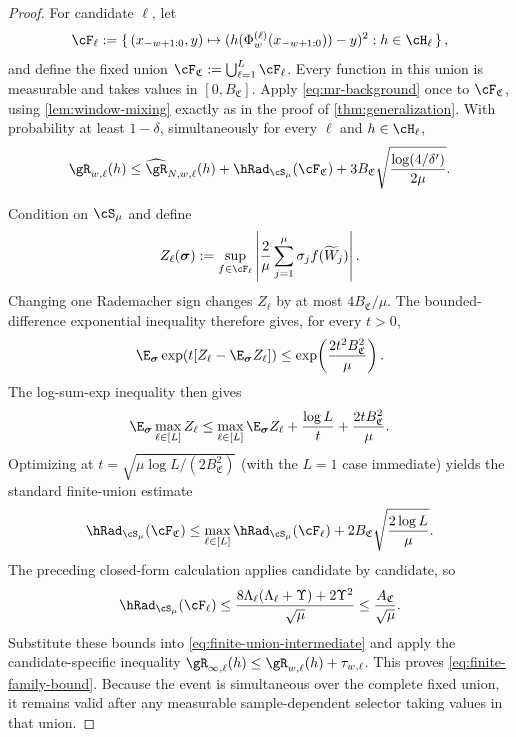 \begin{proof}
For candidate \(\ell\), let
\[
    \cF_\ell
    :=
    \set{(x_{-w+1:0},y)\mapsto
      (h(\Phi_w^{(\ell)}(x_{-w+1:0}))-y)^2:
      h\in\cH_\ell},
\]
and define the fixed union
\(\cF_{\mathfrak C}:=\bigcup_{\ell=1}^L\cF_\ell\). Every function in this
union is measurable and takes values in \([0,B_{\mathfrak C}]\). Apply
\cref{eq:mr-background} once to \(\cF_{\mathfrak C}\), using
\cref{lem:window-mixing} exactly as in the proof of
\cref{thm:generalization}. With probability at least \(1-\delta\),
simultaneously for every \(\ell\) and \(h\in\cH_\ell\),
\begin{equation}
    \risk_{w,\ell}(h)
    \leq
    \erisk_{N,w,\ell}(h)
    +\hRad_{\cS_\mu}(\cF_{\mathfrak C})
    +3B_{\mathfrak C}
      \sqrt{\frac{\log(4/\delta')}{2\mu}}.
    \label{eq:finite-union-intermediate}
\end{equation}

Condition on \(\cS_\mu\) and define
\[
    Z_\ell(\bm\sigma)
    :=
    \sup_{f\in\cF_\ell}
    \abs{\frac2\mu\sum_{j=1}^\mu
    \sigma_j f(\widetilde W_j)}.
\]
Changing one Rademacher sign changes \(Z_\ell\) by at most
\(4B_{\mathfrak C}/\mu\). The bounded-difference exponential inequality
\citep{McDiarmid1989} therefore gives, for every \(t>0\),
\[
    \E_{\bm\sigma}
    \exp\!\left(t[Z_\ell-\E_{\bm\sigma}Z_\ell]\right)
    \leq
    \exp\!\left(\frac{2t^2B_{\mathfrak C}^2}{\mu}\right).
\]
The log-sum-exp inequality then gives
\[
    \E_{\bm\sigma}\max_{\ell\in[L]}Z_\ell
    \leq
    \max_{\ell\in[L]}\E_{\bm\sigma}Z_\ell
    +\frac{\log L}{t}+\frac{2tB_{\mathfrak C}^2}{\mu}.
\]
Optimizing at
\(t=\sqrt{\mu\log L/(2B_{\mathfrak C}^2)}\) (with the \(L=1\) case
immediate) yields the standard finite-union estimate
\citep{BartlettMendelson2002}
\[
    \hRad_{\cS_\mu}(\cF_{\mathfrak C})
    \leq
    \max_{\ell\in[L]}\hRad_{\cS_\mu}(\cF_\ell)
    +2B_{\mathfrak C}\sqrt{\frac{2\log L}{\mu}}.
\]
The preceding closed-form calculation applies candidate by candidate, so
\[
    \hRad_{\cS_\mu}(\cF_\ell)
    \leq
    \frac{8\Lambda_\ell(\Lambda_\ell+\Upsilon)+2\Upsilon^2}{\sqrt\mu}
    \leq\frac{A_{\mathfrak C}}{\sqrt\mu}.
\]
Substitute these bounds into \cref{eq:finite-union-intermediate} and apply the
candidate-specific inequality
\(\risk_{\infty,\ell}(h)\leq\risk_{w,\ell}(h)+\tau_{w,\ell}\).
This proves \cref{eq:finite-family-bound}. Because the event is simultaneous
over the complete fixed union, it remains valid after any measurable
sample-dependent selector taking values in that union.
\end{proof}

